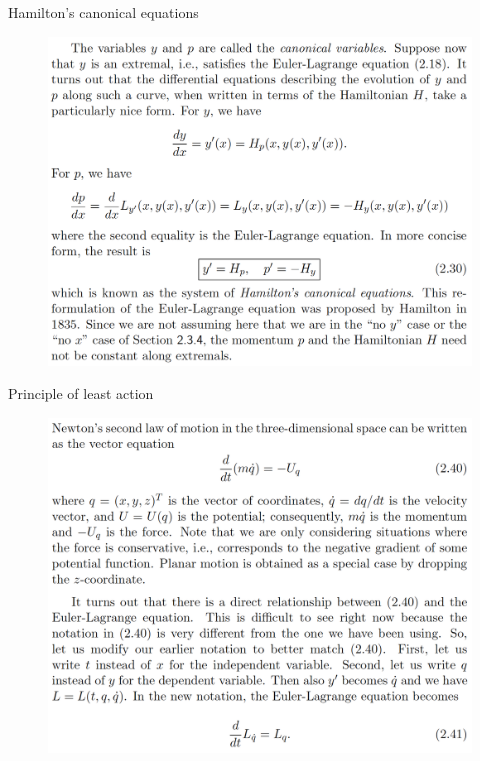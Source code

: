 \documentclass{beamer}
\begin{document}
\begin{frame}{Hamilton's canonical equations}
    \begin{figure}
        \centering
        \includegraphics[width=0.9\linewidth]{ch2/fig20.png}
    \end{figure}
\end{frame}

\begin{frame}{Principle of least action}
    \begin{figure}
        \centering
        \includegraphics[width=0.9\linewidth]{ch2/fig21.png}
    \end{figure}
\end{frame}
\end{document}

